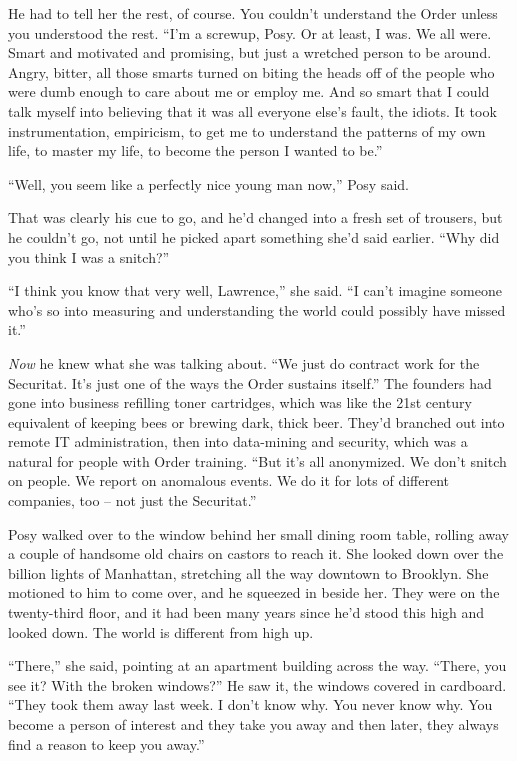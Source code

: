 He had to tell her the rest, of course. You couldn't understand the 
Order unless you understood the rest. “I'm a screwup, Posy. Or at 
least, I was. We all were. Smart and motivated and promising, but just 
a wretched person to be around. Angry, bitter, all those smarts turned 
on biting the heads off of the people who were dumb enough to care 
about me or employ me. And so smart that I could talk myself into 
believing that it was all everyone else's fault, the idiots. It took 
instrumentation, empiricism, to get me to understand the patterns of my 
own life, to master my life, to become the person I wanted to be.”

“Well, you seem like a perfectly nice young man now,” Posy said.

That was clearly his cue to go, and he'd changed into a fresh set of 
trousers, but he couldn't go, not until he picked apart something she'd 
said earlier. “Why did you think I was a snitch?”

“I think you know that very well, Lawrence,” she said. “I can't 
imagine someone who's so into measuring and understanding the world 
could possibly have missed it.”

\emph{Now} he knew what she was talking about. “We just do contract 
work for the Securitat. It's just one of the ways the Order sustains 
itself.” The founders had gone into business refilling toner 
cartridges, which was like the 21st century equivalent of keeping bees 
or brewing dark, thick beer. They'd branched out into remote IT 
administration, then into data-mining and security, which was a natural 
for people with Order training. “But it's all anonymized. We don't 
snitch on people. We report on anomalous events. We do it for lots of 
different companies, too -- not just the Securitat.”

Posy walked over to the window behind her small dining room table, 
rolling away a couple of handsome old chairs on castors to reach it. 
She looked down over the billion lights of Manhattan, stretching all 
the way downtown to Brooklyn. She motioned to him to come over, and he 
squeezed in beside her. They were on the twenty-third floor, and it had 
been many years since he'd stood this high and looked down. The world 
is different from high up.

“There,” she said, pointing at an apartment building across the 
way. “There, you see it? With the broken windows?” He saw it, the 
windows covered in cardboard. “They took them away last week. I don't 
know why. You never know why. You become a person of interest and they 
take you away and then later, they always find a reason to keep you 
away.”


